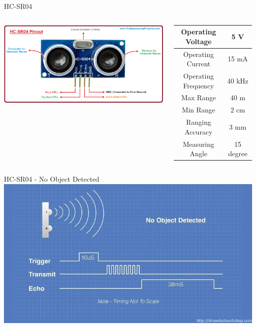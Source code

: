 \documentclass[12pt,letterpaper]{beamer}
\begin{document}
\begin{frame}{HC-SR04}
    \begin{columns}
        \includegraphics[width=1.1\linewidth]{HC-SR04}

        {\footnotesize
            \begin{tabular}{ cc }
                \hline
                Operating Voltage & 5 V  \\
                \hline
                Operating Current & 15 mA  \\
                \hline
                Operating Frequency & 40 kHz  \\
                \hline
                Max Range & 40 m  \\
                \hline
                Min Range & 2 cm  \\
                \hline
                Ranging Accuracy & 3 mm  \\
                \hline
                Measuring Angle & 15 degree  \\
                \hline
            \end{tabular}
        }
    \end{columns}
\end{frame}

\begin{frame}{HC-SR04 - No Object Detected}
    \includegraphics[width=.95\linewidth]{no_object}
\end{frame}
\end{document}
